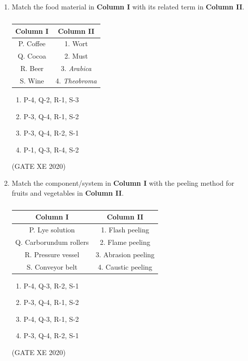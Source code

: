 \documentclass[12pt]{article}
\begin{document}
\begin{enumerate}
\begin{enumerate}
\item P-3, Q-1, R-2, S-4
\item P-1, Q-4, R-2, S-3
\item P-4, Q-3, R-1, S-2
\item P-3, Q-4, R-2, S-1
\end{enumerate}
(GATE XE 2020)

\item Match the food material in \textbf{Column I} with its related term in \textbf{Column II}.
\begin{table}[H]
\centering
\caption{}
\label{}
\begin{tabular}{|c|c|}
\hline
Column I & Column II \\
\hline
P. Coffee & 1. Wort \\
Q. Cocoa & 2. Must \\
R. Beer & 3. \textit{Arabica} \\
S. Wine & 4. \textit{Theobroma} \\
\hline
\end{tabular}
\end{table}

\begin{enumerate}
\item P-4, Q-2, R-1, S-3
\item P-3, Q-4, R-1, S-2
\item P-3, Q-4, R-2, S-1
\item P-1, Q-3, R-4, S-2
\end{enumerate}
(GATE XE 2020)

\item Match the component/system in \textbf{Column I} with the peeling method for fruits and vegetables in \textbf{Column II}.
\begin{table}[h!]
\centering
\caption{}
\label{}
\begin{tabular}{|c|c|}
\hline
Column I & Column II \\
\hline
P. Lye solution & 1. Flash peeling \\
Q. Carborundum rollers & 2. Flame peeling \\
R. Pressure vessel & 3. Abrasion peeling \\
S. Conveyor belt & 4. Caustic peeling \\
\hline
\end{tabular}
\end{table}

\begin{enumerate}
\item P-4, Q-3, R-2, S-1
\item P-3, Q-4, R-1, S-2
\item P-4, Q-3, R-1, S-2
\item P-3, Q-4, R-2, S-1
\end{enumerate}
(GATE XE 2020)


\end{enumerate}
\end{document}
